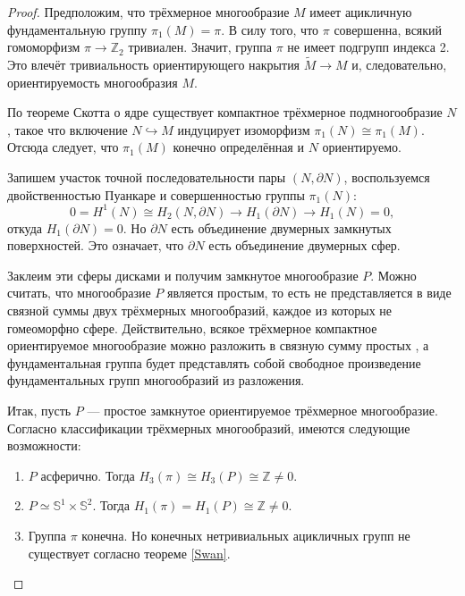 \documentclass[14pt, dvipsnames, twoside]{extarticle}
\theoremstyle{definition}
\theoremstyle{remark}
\begin{document}
\begin{proof}
Предположим, что трёхмерное многообразие $M$ имеет ацикличную фундаментальную группу $\pi_1(M) = \pi$. В силу того, что $\pi$ совершенна, всякий гомоморфизм $\pi\to\mathbb{Z}_2$ тривиален. Значит, группа $\pi$ не имеет подгрупп индекса 2. Это влечёт тривиальность ориентирующего накрытия $\widetilde{M}\to M$ и, следовательно, ориентируемость многообразия $M$. 

По теореме Скотта о ядре \cite{Scott} существует компактное трёхмерное подмногообразие $N$, такое что включение $N\hookrightarrow M$ индуцирует изоморфизм $\pi_1(N)\cong\pi_1(M)$. Отсюда следует, что $\pi_1(M)$ конечно определённая и $N$ ориентируемо.

Запишем участок точной последовательности пары $(N, \partial N)$, воспользуемся двойственностью Пуанкаре и совершенностью группы $\pi_1(N)$: $$0 = H^1(N)\cong H_2(N, \partial N)\to H_1(\partial N)\to H_1(N) = 0,$$ откуда $H_1(\partial N) = 0$. Но $\partial N$ есть объединение двумерных замкнутых поверхностей. Это означает, что $\partial N$ есть объединение двумерных сфер.

Заклеим эти сферы дисками и получим замкнутое многообразие $P$. Можно считать, что многообразие $P$ является простым, то есть не представляется в виде связной суммы двух трёхмерных многообразий, каждое из которых не гомеоморфно сфере. Действительно, всякое трёхмерное компактное ориентируемое многообразие можно разложить в связную сумму простых \cite{Hempel}, а фундаментальная группа будет представлять собой свободное произведение фундаментальных групп многообразий из разложения. 

Итак, пусть $P$ --- простое замкнутое ориентируемое трёхмерное многообразие. Согласно классификации трёхмерных многообразий, имеются следующие возможности:

\begin{enumerate}[\bf 1.]

\item $P$ асферично. Тогда $H_3(\pi)\cong H_3(P)\cong \mathbb{Z}\neq 0$.

\item $P\simeq \mathbb{S}^1\times\mathbb{S}^2$. Тогда $H_1(\pi) = H_1(P)\cong \mathbb{Z}\neq 0$.

\item Группа $\pi$ конечна. Но конечных нетривиальных ацикличных групп не существует согласно теореме \ref{Swan}.

\end{enumerate}
 
\end{proof}
\end{document}
